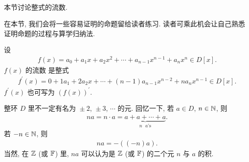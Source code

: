 \subsection*{\Fluxions}
\markright{\Fluxions}

本节讨论整式的流数.

在本节, 我们会将一些容易证明的命题留给读者练习. 读者可乘此机会让自己熟悉证明命题的过程与算学归纳法.

\begin{definition}
    设
    \begin{align*}
        f(x) = a_0 + a_1 x + a_2 x^2 + \cdots + a_{n-1} x^{n-1} + a_n x^n \in D[x].
    \end{align*}
    $f(x)$ 的流数  是整式
    \begin{align*}
        f^{\prime}(x) = 0 + 1a_1 + 2a_2 x + \cdots + (n-1)a_{n-1} x^{n-2} + na_n x^{n-1} \in D[x].
    \end{align*}
    $f^{\prime} (x)$ 也可写为 $(f(x))^{\prime}$.
\end{definition}

\begin{remark}
    整环 $D$ 里不一定有名为 ${} \pm 2$, ${}\pm 3$, $\cdots$ 的元. 回忆一下, 若 $a \in D$, $n \in \mathbb{N}$, 则
    \begin{align*}
        na = n \cdot a = \underbrace{a + a + \cdots + a}_{\text{$n$ $a$'s}}.
    \end{align*}
    若 $-n \in \mathbb{N}$, 则
    \begin{align*}
        na = -((-n)a).
    \end{align*}
    当然, 在 $\mathbb{Z}$ (或 $\mathbb{F}$) 里, $na$ 可以认为是 $\mathbb{Z}$ (或 $\mathbb{F}$) 的二个元 $n$ 与 $a$ 的积.
\end{remark}

